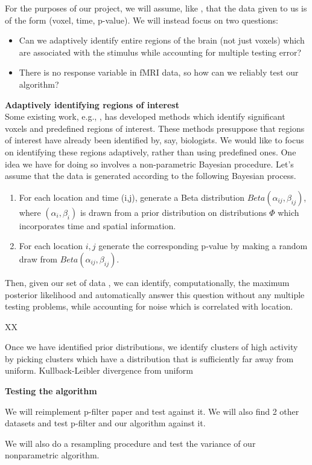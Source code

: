 \documentclass[12pt]{article}
\begin{document}
For the purposes of our project, we will assume, like \cite{foygel2015p}, that the data given to us is of the form (voxel, time, p-value). We will instead focus on two questions: 
\begin{itemize}
\item Can we adaptively identify entire regions of the brain (not just voxels) which are associated with the stimulus while
accounting for multiple testing error?
\item There is no response variable in fMRI data, so how can we reliably test our algorithm? 
\end{itemize}
\vspace{1em}
{\bf Adaptively identifying regions of interest}  \\
Some existing work, e.g.,  \cite{foygel2015p},  has developed methods which identify significant voxels and  predefined regions of interest. 
These methods presuppose that regions of interest have already been identified by, say, biologists. We would like to focus on 
identifying these regions adaptively, rather than using predefined ones. One idea we have for doing so involves 
a non-parametric Bayesian procedure.  Let's assume that the data is generated according to the following Bayesian 
process. 
\begin{enumerate}
\item  For each location and time (i,j),  generate a Beta distribution $Beta(\alpha_{ij}, \beta_{ij})$, 
where $(\alpha_i, \beta_i)$ is drawn from a prior distribution on distributions $\Phi$ which incorporates time and spatial information. 
\item For each location $i,j$ generate the corresponding p-value by making a random draw from $Beta(\alpha_{ij}, \beta_{ij})$. 
\end{enumerate}


Then, given our set of data , we can identify, computationally, the maximum posterior likelihood and 
automatically answer this question without any multiple testing problems, while accounting for noise which is correlated with location. 

XX 







Once we have identified prior distributions, we identify clusters of high activity 
by picking clusters which have a distribution that is sufficiently far
away from uniform.  Kullback-Leibler divergence from uniform 


{\bf Testing the algorithm } 

We will reimplement p-filter paper and test against it.  We will also find 2 other datasets and test p-filter and our algorithm against it. 

We will also do a resampling procedure and test the variance of our nonparametric algorithm. 



 

\end{document}
